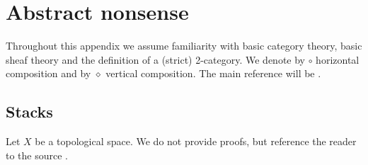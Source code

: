 \chapter{Abstract nonsense}\label{app:abstract-nonsense}
Throughout this appendix we assume familiarity with basic category theory, basic sheaf theory and the definition of a (strict) 2-category. We denote by $\circ$ horizontal composition and by $\diamond$ vertical composition. The main reference will be \cite{breen}. 
	
\section{Stacks}\label{sec:stacks}
Let $X$ be a topological space. We do not provide proofs, but reference the reader to the source \cite[Exposé VI]{SGA1}.
